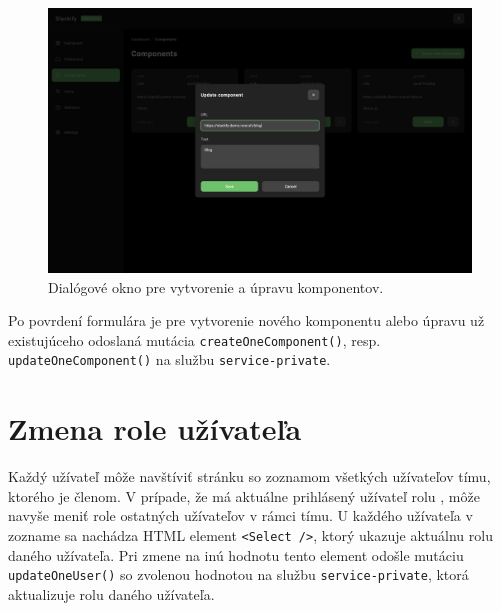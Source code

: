 \begin{figure}[h]
	\centering
	\includegraphics[scale=0.085]{obrazky-figures/screenshot_component_update}
	\caption{Dialógové okno pre vytvorenie a úpravu komponentov.}
\end{figure}

\noindent Po povrdení formulára je pre vytvorenie nového komponentu alebo úpravu už existujúceho odoslaná mutácia \texttt{createOneComponent()}, resp. \texttt{updateOneComponent()} na službu \texttt{service-private}.

\section{Zmena role užívateľa}
Každý užívateľ môže navštíviť stránku so zoznamom všetkých užívateľov tímu, ktorého je členom. V prípade, že má aktuálne prihlásený užívateľ rolu , môže navyše meniť role ostatných užívateľov v rámci tímu. U každého užívateľa v zozname sa nachádza HTML element \texttt{<Select />}, ktorý ukazuje aktuálnu rolu daného užívateľa. Pri zmene na inú hodnotu tento element odošle mutáciu \texttt{updateOneUser()} so zvolenou hodnotou na službu \texttt{service-private}, ktorá aktualizuje rolu daného užívateľa.
